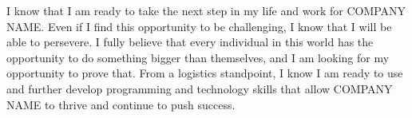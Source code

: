 \documentclass[11pt, a4paper]{awesome-cv}
\begin{document}
\begin{cvletter}
I know that I am ready to take the next step in my life and work for COMPANY NAME. Even if I find this opportunity to be challenging, I know that I will be able to persevere. I fully believe that every individual in this world has the opportunity to do something bigger than themselves, and I am looking for my opportunity to prove that. From a logistics standpoint, I know I am ready to use and further develop programming and technology skills that allow COMPANY NAME to thrive and continue to push success.

\end{cvletter}
\makeletterclosing
\end{document}
